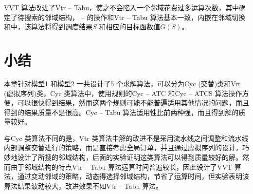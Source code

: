 VVT 算法改进了Vtr -- Tabu，使之不会陷入一个邻域花费过多运算次数，其中确定了待搜索的邻域结构， -- 的操作和Vtr -- Tabu 算法基本一致，内嵌在邻域切换和中，该算法将得到调度结果$S$ 和相应的目标函数值$G(S)$。

\section{小结}
本章针对模型1 和模型2 一共设计了5 个求解算法，可以分为Cyc (交替)类和Vrt (虚拟序列)类，Cyc 类算法中，使用规则的Cyc -- ATC 和Cyc -- ATCS 算法操作方便，可以很快得到结果，然而这两个规则可能不能普遍适用其他情况的问题，而且得到的结果质量不是很高。Cyc -- Tabu 算法适用性比前两种强，而且得到解的质量较好。

与Cyc 类算法不同的是，Vtr 类算法中解的改进不是采用流水线之间调整和流水线内部调整交替进行的策略，而是直接考虑全局订单，并且通过虚拟序列的设计，巧妙地设计了所搜的邻域结构，后面的实验证明这类算法可以得到质量较好的解。然而由于邻域结构的特点Vtr -- Tabu 算法运算时间普遍较长，因此设计了VVT 算法，通过变动邻域的策略，动态得选择邻域结构，节省了运算时间，但实验表明该算法结果波动较大，改进效果不如Vtr -- Tabu 算法。